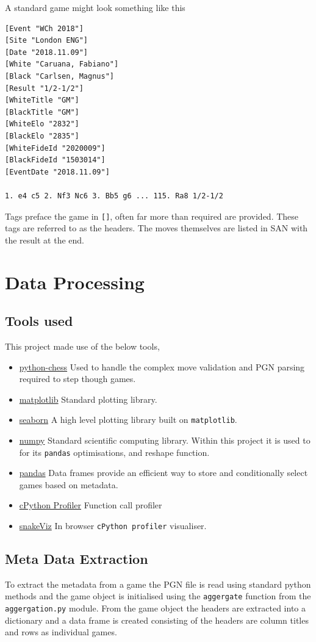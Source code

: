 \documentclass[11pt]{article}
\begin{document}
A standard game might look something like this
\begin{verbatim}
[Event "WCh 2018"]
[Site "London ENG"]
[Date "2018.11.09"]
[White "Caruana, Fabiano"]
[Black "Carlsen, Magnus"]
[Result "1/2-1/2"]
[WhiteTitle "GM"]
[BlackTitle "GM"]
[WhiteElo "2832"]
[BlackElo "2835"]
[WhiteFideId "2020009"]
[BlackFideId "1503014"]
[EventDate "2018.11.09"]

1. e4 c5 2. Nf3 Nc6 3. Bb5 g6 ... 115. Ra8 1/2-1/2
\end{verbatim}
Tags preface the game in \texttt{[]}, often far more than required are provided. These tags are referred to as the headers. The moves themselves are listed in SAN with the result at the end.
\section{Data Processing}
\label{sec:orge50f40c}
\subsection{Tools used}
\label{sec:org43fec0b}
This project made use of the below tools,
\begin{itemize}
\item \href{https://github.com/niklasf/python-chess}{python-chess}
Used to handle the complex move validation and PGN parsing required to step though games.
\item \href{https://matplotlib.org/}{matplotlib}
Standard plotting library.
\item \href{https://seaborn.pydata.org/}{seaborn}
A high level plotting library built on \texttt{matplotlib}.
\item \href{https://numpy.org/}{numpy}
Standard scientific computing library. Within this project it is used to for its \texttt{pandas} optimisations, and reshape function.
\item \href{https://pandas.pydata.org/}{pandas}
Data frames provide an efficient way to store and conditionally select games based on metadata.
\item \href{https://github.com/python/cpython}{cPython Profiler}
Function call profiler
\item \href{https://jiffyclub.github.io/snakeviz/}{snakeViz}
In browser \texttt{cPython profiler} visualiser.
\end{itemize}

\subsection{Meta Data Extraction}
\label{sec:org731bb34}
To extract the metadata from a game the PGN file is read using standard python methods and the game object is initialised using the \texttt{aggergate} function from the \texttt{aggergation.py} module. From the game object the headers are extracted into a dictionary and a data frame is created consisting of the headers are column titles and rows as individual games.
\end{document}
